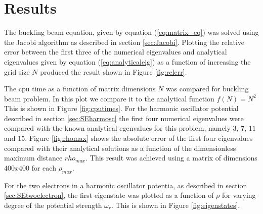 \documentclass[twocolumn]{aastex62}
\begin{document}
\section{Results} \label{sec:results}
The buckling beam equation, given by equation (\ref{eq:matrix_eq}) was solved using the Jacobi algorithm as described in section \ref{sec:Jacobi}. Plotting the relative error between the first three of the numerical eigenvalues and analytical eigenvalues given by equation (\ref{eq:analyticaleig}) as a function of increasing the grid size $N$ produced the result shown in Figure \ref{fig:relerr}.
\begin{figure*}[h]
	\caption{Figure showing the relative error between the numerical and analytical eigenvalues given by equation \ref{eq:analyticaleig} for the buckling beam problem given by \ref{eq:matrix_eq}. }
	\label{fig:relerr}
\end{figure*}
\begin{figure*}[h]
	\caption{Figure showing the CPU time as a function of matrix dimension $N$ when solving the buckling beam problem with the jacobi algorithm. The data is compared with the analytical function $f(N)=N^2$.}
	\label{fig:cputimes}
\end{figure*}
The cpu time as a function of matrix dimensions $N$ was compared for buckling beam problem. In this plot we compare it to the analytical function $f(N)=N^2$ This is shown in Figure \ref{fig:cputimes}. For the harmonic oscillator potential described in section \ref{sec:SEharmosc} the first four numerical eigenvalues were compared with the known analytical egenvalues for this problem, namely $3$, $7$, $11$ and $15$. Figure \ref{fig:rhomax} shows the absolute error of the first four eigenvalues compared with their analytical solutions as a function of the dimensionless maximum distance $rho_{max}$. This result was achieved using a matrix of dimensions $400x400$ for each $\rho_{max}$.\\\indent
\begin{figure*}[h]
	\caption{Figure showing the absolute error of the first four eigenvalues for the harmonic oscillator potential described in section \ref{sec:SEharmosc} as a function of varying the dimensionless maximum distance $\rho_{max}$.}
	\label{fig:rhomax}
\end{figure*}
For the two electrons in a harmonic oscillator potentia, as described in section \ref{sec:SEtwoelectron}, the first eigenstate was plotted as a function of $\rho$ for varying degree of the potential strength $\omega_r$.  This is shown in Figure \ref{fig:eigenstates}.
\begin{figure*}[h]
	\caption{Figure showing the eigenvector for the ground state in the two electron harmonic oscillator potential as described in section \ref{sec:SEtwoelectron} for varying $\omega$}
	\label{fig:eigenstates}
\end{figure*}
\end{document}
